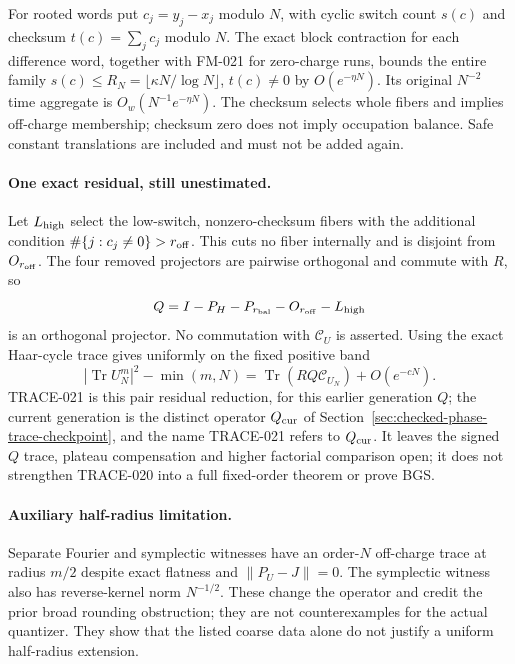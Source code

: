 For rooted words put $c_j=y_j-x_j$ modulo $N$, with cyclic switch count
$s(c)$ and checksum $t(c)=\sum_jc_j$ modulo $N$. The exact block contraction
for each difference word, together with FM-021 for zero-charge runs, bounds
the entire family $s(c)\le R_N=\lfloor\kappa N/\log N\rfloor$,
$t(c)\ne0$ by $O(e^{-\eta N})$. Its original $N^{-2}$ time aggregate is
$O_w(N^{-1}e^{-\eta N})$. The checksum selects whole fibers and implies
off-charge membership; checksum zero does not imply occupation balance.
Safe constant translations are included and must not be added again.

\paragraph{One exact residual, still unestimated.}
Let $L_{\rm high}$ select the low-switch, nonzero-checksum fibers with the
additional condition $\#\{j:c_j\ne0\}>r_{\rm off}$. This cuts no fiber
internally and is disjoint from $O_{r_{\rm off}}$. The four removed projectors
are pairwise orthogonal and commute with $R$, so
\[
 Q=I-P_H-P_{r_{\rm bal}}-O_{r_{\rm off}}-L_{\rm high}
\]
is an orthogonal projector. No commutation with $\mathcal C_U$ is asserted.
Using the exact Haar-cycle trace gives uniformly on the fixed positive band
\[
 |\operatorname{Tr}U_N^m|^2-\min(m,N)
   =\operatorname{Tr}(RQ\mathcal C_{U_N})+O(e^{-cN}).
\]
TRACE-021 is this pair residual reduction, for this earlier generation
$Q$; the current generation is the distinct operator $Q_{\rm cur}$ of
Section~\ref{sec:checked-phase-trace-checkpoint}, and the name TRACE-021
refers to $Q_{\rm cur}$. It leaves the signed $Q$ trace,
plateau compensation and higher factorial comparison open; it does not
strengthen TRACE-020 into a full fixed-order theorem or prove BGS.

\paragraph{Auxiliary half-radius limitation.}
Separate Fourier and symplectic witnesses have an order-$N$ off-charge trace
at radius $m/2$ despite exact flatness and $\|P_U-J\|=0$. The
symplectic witness also has reverse-kernel norm $N^{-1/2}$. These change the
operator and credit the prior broad rounding obstruction; they are not
counterexamples for the actual quantizer. They show that the listed coarse
data alone do not justify a uniform half-radius extension.
